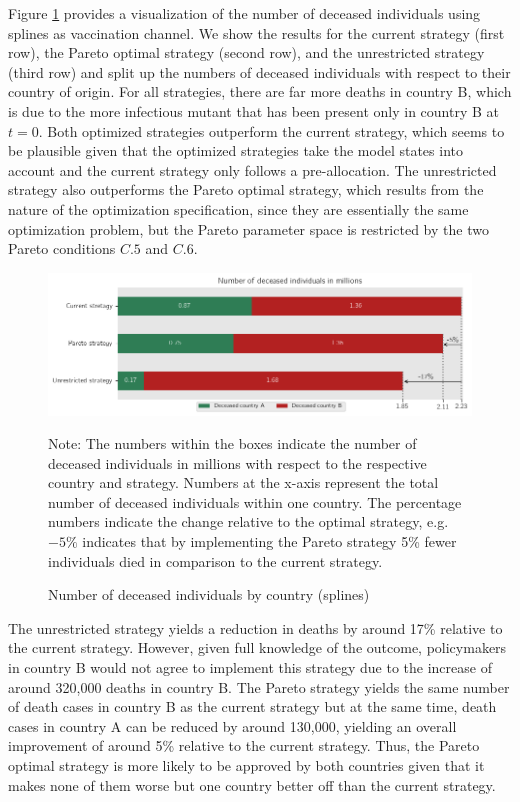 Figure \ref{fig:results_splines_numbers} provides a visualization of the number of deceased individuals using splines as vaccination channel. We show the results for the current strategy (first row), the Pareto optimal strategy (second row), and the unrestricted strategy (third row) and split up the numbers of deceased individuals with respect to their country of origin. For all strategies, there are far more deaths in country B, which is due to the more infectious mutant that has been present only in country B at $t=0$. Both optimized strategies outperform the current strategy, which seems to be plausible given that the optimized strategies take the model states into account and the current strategy only follows a pre-allocation. The unrestricted strategy also outperforms the Pareto optimal strategy, which results from the nature of the optimization specification, since they are essentially the same optimization problem, but the Pareto parameter space is restricted by the two Pareto conditions $C.5$ and $C.6$. 
\begin{figure}[h!]
\centering
\includegraphics[scale=0.75]{images/splines_percentage_deviation.png}
\begin{flushleft}
\scriptsize{Note: The numbers within the boxes indicate the number of deceased individuals in millions with respect to the respective country and strategy. Numbers at the x-axis represent the total number of deceased individuals within one country. The percentage numbers indicate the change relative to the optimal strategy, e.g. $-5\%$ indicates that by implementing the Pareto strategy 5\% fewer individuals died in comparison to the current strategy.}
\end{flushleft}
\caption{Number of deceased individuals by country (splines)}
\label{fig:results_splines_numbers}
\end{figure}

The unrestricted strategy yields a reduction in deaths by around 17\% relative to the current strategy. However, given full knowledge of the outcome, policymakers in country B would not agree to implement this strategy due to the increase of around 320,000 deaths in country B. The Pareto strategy yields the same number of death cases in country B as the current strategy but at the same time, death cases in country A can be reduced by around 130,000, yielding an overall improvement of around 5\% relative to the current strategy. Thus, the Pareto optimal strategy is more likely to be approved by both countries given that it makes none of them worse but one country better off than the current strategy. \\

